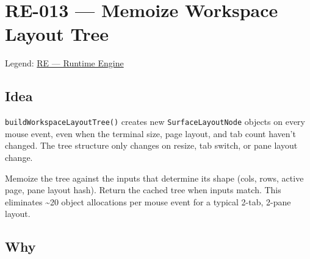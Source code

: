 \chapter{RE-013 --- Memoize Workspace Layout Tree}\label{record-364}

\smallskip

Legend: \href{https://github.com/flyingrobots/bijou/blob/cbd70612140e7a450d764b3c7be1c6af878b99bc/docs/method/graveyard/legends/RE-runtime-engine.md}{RE --- Runtime Engine}

\section{Idea}\label{record-364-idea}

\texttt{b\allowbreak{}u\allowbreak{}i\allowbreak{}l\allowbreak{}d\allowbreak{}W\allowbreak{}o\allowbreak{}r\allowbreak{}k\allowbreak{}s\allowbreak{}p\allowbreak{}a\allowbreak{}c\allowbreak{}e\allowbreak{}L\allowbreak{}a\allowbreak{}y\allowbreak{}o\allowbreak{}u\allowbreak{}t\allowbreak{}T\allowbreak{}r\allowbreak{}e\allowbreak{}e\allowbreak{}(\allowbreak{})} creates new \texttt{S\allowbreak{}u\allowbreak{}r\allowbreak{}f\allowbreak{}a\allowbreak{}c\allowbreak{}e\allowbreak{}L\allowbreak{}a\allowbreak{}y\allowbreak{}o\allowbreak{}u\allowbreak{}t\allowbreak{}N\allowbreak{}o\allowbreak{}d\allowbreak{}e} objects on every mouse event, even when the terminal size, page layout, and tab count haven't changed. The tree structure only changes on resize, tab switch, or pane layout change.

Memoize the tree against the inputs that determine its shape (cols, rows, active page, pane layout hash). Return the cached tree when inputs match. This eliminates \textasciitilde20 object allocations per mouse event for a typical 2-tab, 2-pane layout.

\section{Why}\label{record-364-why}

